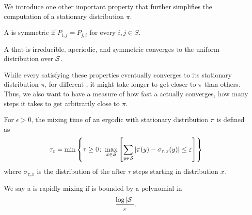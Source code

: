 We introduce one other important property that further simplifies the computation of a stationary distribution $\pi$. 

\begin{definition}[Symmetric]
  A \markov is symmetric if $P_{i, j} = P_{j, i}$ for every $i, j \in S$.
\end{definition}

\begin{lemma}\label{lem:sym_mc_uniform}
  A \markov that is irreducible, aperiodic, and symmetric converges to the uniform distribution over $\mathcal{S}$.
\end{lemma}

\noindent While every \markov satisfying these properties eventually converges to its stationary distribution $\pi$, for different \markovs, it might take longer to get closer to $\pi$ than others.
Thus, we also want to have a measure of how fast a \markov actually converges, \ie how many steps it takes to get arbitrarily close to $\pi$.

\begin{definition}[MixingTime]\label{def:mixing_time}
  For $\epsilon > 0$, the mixing time \mixtime of an ergodic \markov with stationary distribution $\pi$ is defined as \[
    \tau_{\varepsilon} = \min\left\{\tau \geq 0 \colon \max_{x \in \mathcal{S}}\left[\sum_{y \in \mathcal{S}}|\pi(y) - \sigma_{\tau, x}(y)| \leq \varepsilon\right]\right\}
  \] where $\sigma_{\tau, x}$ is the distribution of the \markov after $\tau$ steps starting in distribution $x$.
\end{definition}

\noindent We say a \markov is rapidly mixing if \mixtime is bounded by a polynomial in \[
  \frac{\log|\mathcal{S}|}{\varepsilon}.
\]

